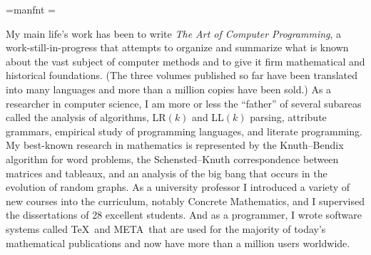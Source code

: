   \def\MF{{\manual META}\-{\manual FONT}}%
\font\manual=manfnt %
\magnification = 

\nopagenumbers
\parindent=0pt \parskip=6pt


My main life's work has been to write {\sl The Art of Computer Programming},
a work-still-in-progress that attempts to organize and summarize what is
known about the vast subject of computer methods and to give it firm
mathematical and historical foundations. (The three volumes published so
far have been translated into many languages and more than a million copies
have been sold.) As a researcher in computer science, I am more or less
the ``father'' of several subareas called the analysis of algorithms,
LR$(k)$ and LL$(k)$ parsing, attribute grammars, empirical study of
programming languages, and literate programming. My best-known research
in mathematics is represented by the Knuth--Bendix algorithm for word
problems, the Schensted--Knuth correspondence between matrices and tableaux,
and an analysis of the big bang that occurs in the evolution of random graphs.
As a university professor I introduced a variety of new courses into the
curriculum, notably Concrete Mathematics, and I supervised the dissertations
of 28 excellent students. And as a programmer, I wrote software systems
called \TeX\ and \MF\ that are used for the majority of today's mathematical
publications and now have more than a million users worldwide.

\bye
